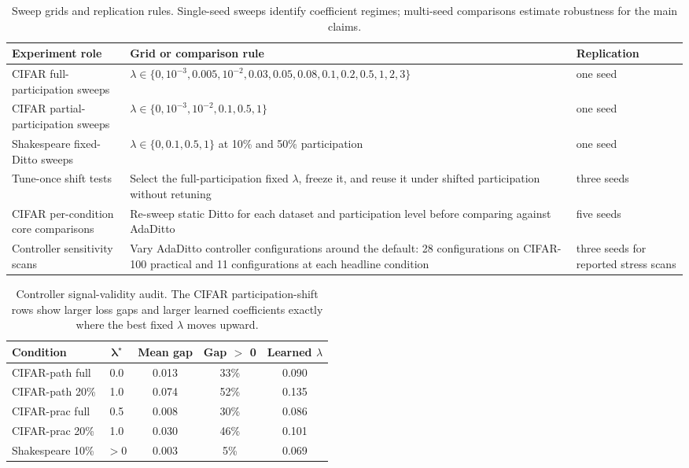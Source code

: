\documentclass[letterpaper]{article}
\begin{document}
\begin{table}[t]
\centering
\scriptsize
\setlength{\tabcolsep}{4pt}
\renewcommand{\arraystretch}{1.08}
\begin{tabular*}{\textwidth}{@{\extracolsep{\fill}}p{}p{}p{}@{}}
\toprule
\textbf{Experiment role} & \textbf{Grid or comparison rule} & \textbf{Replication} \\
\midrule
CIFAR full-participation sweeps &
$\lambda\in\{0,10^{-3},0.005,10^{-2},0.03,0.05,0.08,0.1,0.2,0.5,1,2,3\}$ &
one seed \\
CIFAR partial-participation sweeps &
$\lambda\in\{0,10^{-3},10^{-2},0.1,0.5,1\}$ &
one seed \\
Shakespeare fixed-Ditto sweeps &
$\lambda\in\{0,0.1,0.5,1\}$ at 10\% and 50\% participation &
one seed \\
Tune-once shift tests &
Select the full-participation fixed $\lambda$, freeze it, and reuse it under shifted participation without retuning &
three seeds \\
CIFAR per-condition core comparisons &
Re-sweep static Ditto for each dataset and participation level before comparing against AdaDitto &
five seeds \\
Controller sensitivity scans &
Vary AdaDitto controller configurations around the default: 28 configurations on CIFAR-100 practical and 11 configurations at each headline condition &
three seeds for reported stress scans \\
\bottomrule
\end{tabular*}
\caption{Sweep grids and replication rules. Single-seed sweeps identify coefficient regimes; multi-seed comparisons estimate robustness for the main claims.}
\label{tab:supp-sweep-protocol}
\end{table}

\begin{table}[t]
\centering
\small
\setlength{\tabcolsep}{8pt}
\renewcommand{\arraystretch}{1.08}
\begin{tabular*}{\textwidth}{@{\extracolsep{\fill}}lcccc@{}}
\toprule
\textbf{Condition} & $\boldsymbol{\lambda^\star}$ & \textbf{Mean gap} & \textbf{Gap $>$ 0} & \textbf{Learned $\lambda$} \\
\midrule
CIFAR-path full & 0.0 & 0.013 & 33\% & 0.090 \\
CIFAR-path 20\% & 1.0 & 0.074 & 52\% & 0.135 \\
CIFAR-prac full & 0.5 & 0.008 & 30\% & 0.086 \\
CIFAR-prac 20\% & 1.0 & 0.030 & 46\% & 0.101 \\
Shakespeare 10\% & $>0$ & 0.003 & 5\% & 0.069 \\
\bottomrule
\end{tabular*}
\caption{Controller signal-validity audit. The CIFAR participation-shift rows show larger loss gaps and larger learned coefficients exactly where the best fixed $\lambda$ moves upward.}
\label{tab:signal-validity}
\end{table}
\end{document}
